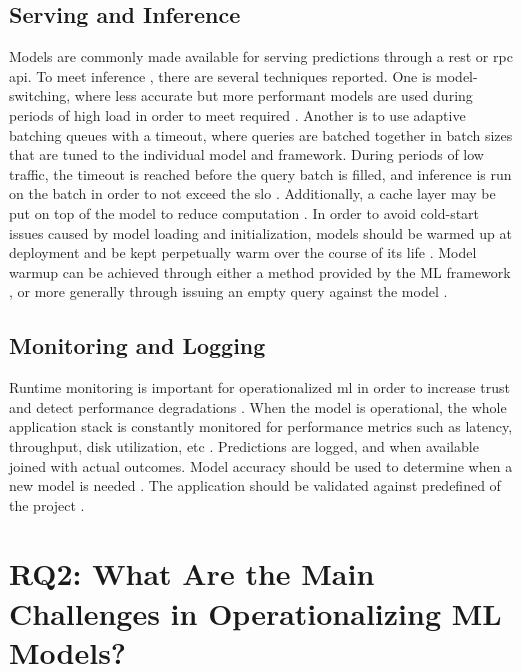 \subsection{Serving and Inference}
Models are commonly made available for serving predictions through a \acrshort{rest} \cite{Krishnamurthi2019, Liu2020, Ruf2021, Garcia2020, Crankshaw2017, Paeaekkoenen2020} or \acrshort{rpc} \cite{Ruf2021, Li2017, Crankshaw2017} \acrshort{api}.
To meet inference , there are several techniques reported.
One is model-switching, where less accurate but more performant models are used during periods of high load in order to meet required  \cite{Zhang2020}.
Another is to use adaptive batching queues with a timeout, where queries are batched together in batch sizes that are tuned to the individual model and framework. During periods of low traffic, the timeout is reached before the query batch is filled, and inference is run on the batch in order to not exceed the \acrshort{slo} \cite{Crankshaw2017}.
Additionally, a cache layer may be put on top of the model to reduce computation \cite{Crankshaw2017}.
In order to avoid cold-start issues caused by model loading and initialization, models should be warmed up at deployment and be kept perpetually warm over the course of its life \cite{Zhang2020}.
Model warmup can be achieved through either a method provided by the ML framework \cite{Li2017}, or more generally through issuing an empty query against the model \cite{Garcia2020}.

\subsection{Monitoring and Logging}
Runtime monitoring is important for operationalized \acrshort{ml} in order to increase trust and detect performance degradations \cite{Rausch2019, Li2017}.
When the model is operational, the whole application stack is constantly monitored for performance metrics such as latency, throughput, disk utilization, etc \cite{Ruf2021, Peticolas2019}.
Predictions are logged, and when available joined with actual outcomes\cite{Li2017}.
Model accuracy should be used to determine when a new model is needed \cite{Peticolas2019}.
The application should be validated against predefined  of the project \cite{Ruf2021}.

\section{RQ2: What Are the Main Challenges in Operationalizing ML Models?}
\label{ch:research_results:rq2_challenges}
